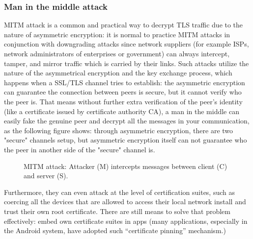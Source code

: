 \documentclass[conference]{IEEEtran}
\begin{document}
\subsubsection{Man in the middle attack}\label{sec:mitm}
MITM attack is a common and practical way to decrypt TLS traffic due to the nature of asymmetric encryption:
it is normal to practice MITM attacks in conjunction with downgrading attacks since network suppliers (for example ISPs, network administrators of enterprises or government) can always intercept, tamper, and mirror traffic which is carried by their links.
Such attacks utilize the nature of the asymmetrical encryption and the key exchange process, which happens when a SSL/TLS channel tries to establish: the asymmetric encryption can guarantee the connection between peers is secure, but it cannot verify who the peer is. That means without further extra verification of the peer's identity (like a certificate issued by certificate authority CA), a man in the middle can easily fake the genuine peer and decrypt all the messages in your communication, as the following figure shows: through asymmetric encryption, there are two "secure" channels setup, but asymmetric encryption itself can not guarantee who the peer in another side of the "secure" channel is.

\begin{figure}[!h]
\centering

\caption{MITM attack: Attacker (M) intercepts messages between client (C) and server (S).}
\label{fig:mitm}
\end{figure}

Furthermore, they can even attack at the level of certification suites, such as coercing all the devices that are allowed to access their local network install and trust their own root certificate. There are still means to solve that problem effectively: embed own certificate suites in apps (many applications, especially in the Android system, have adopted such “certificate pinning” mechanism.)
\end{document}
